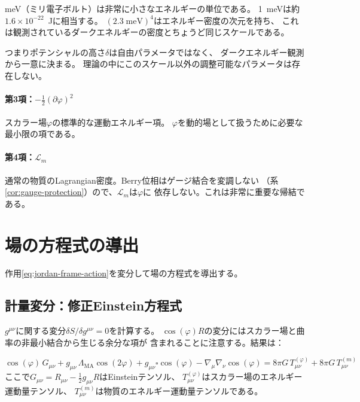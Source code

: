 \begin{hsbox}
meV（ミリ電子ボルト）は非常に小さなエネルギーの単位である。
1~meVは約$1.6\times 10^{-22}$~Jに相当する。
$(2.3\;\mathrm{meV})^4$はエネルギー密度の次元を持ち、
これは観測されているダークエネルギーの密度とちょうど同じスケールである。

つまりポテンシャルの高さ$\delta$は自由パラメータではなく、
ダークエネルギー観測から一意に決まる。
理論の中にこのスケール以外の調整可能なパラメータは存在しない。
\end{hsbox}

\paragraph{第3項：$-\frac{1}{2}(\partial\varphi)^2$}

スカラー場$\varphi$の標準的な運動エネルギー項。
$\varphi$を動的場として扱うために必要な最小限の項である。

\paragraph{第4項：$\mathcal{L}_m$}

通常の物質のLagrangian密度。Berry位相はゲージ結合を変調しない
（系\ref{cor:gauge-protection}）ので、$\mathcal{L}_m$は$\varphi$に
依存しない。これは非常に重要な帰結である。


\section{場の方程式の導出}
\label{sec:8.2}

作用\eqref{eq:jordan-frame-action}を変分して場の方程式を導出する。

\subsection{計量変分：修正Einstein方程式}

$g^{\mu\nu}$に関する変分$\delta S / \delta g^{\mu\nu} = 0$を計算する。
$\cos(\varphi)R$の変分にはスカラー場と曲率の非最小結合から生じる余分な項が
含まれることに注意する。結果は：

\begin{keyresult}[修正Einstein方程式]
\begin{equation}
\boxed{
\cos(\varphi)\,G_{\mu\nu}
+ g_{\mu\nu}\,\Lambda_{\mathrm{MA}}\cos(2\varphi)
+ g_{\mu\nu}\square\cos(\varphi)
- \nabla_\mu\nabla_\nu\cos(\varphi)
= 8\pi G\,T_{\mu\nu}^{(\varphi)} + 8\pi G\,T_{\mu\nu}^{(m)}
}
\label{eq:modified-einstein}
\end{equation}
ここで$G_{\mu\nu} = R_{\mu\nu} - \frac{1}{2}g_{\mu\nu}R$はEinsteinテンソル、
$T_{\mu\nu}^{(\varphi)}$はスカラー場のエネルギー運動量テンソル、
$T_{\mu\nu}^{(m)}$は物質のエネルギー運動量テンソルである。
\end{keyresult}

